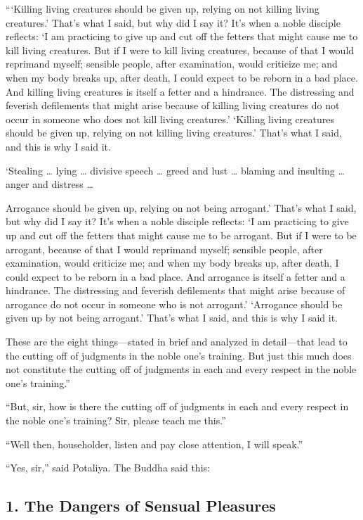 \documentclass[12pt,openany]{book}%
\begin{document}
“‘Killing living creatures should be given up, relying on not killing living creatures.’ That’s what I said, but why did I say it? It’s when a noble disciple reflects: ‘I am practicing to give up and cut off the fetters that might cause me to kill living creatures. But if I were to kill living creatures, because of that I would reprimand myself; sensible people, after examination, would criticize me; and when my body breaks up, after death, I could expect to be reborn in a bad place. And killing living creatures is itself a fetter and a hindrance. The distressing and feverish defilements that might arise because of killing living creatures do not occur in someone who does not kill living creatures.’ ‘Killing living creatures should be given up, relying on not killing living creatures.’ That’s what I said, and this is why I said it. 

‘Stealing … lying … divisive speech … greed and lust … blaming and insulting … anger and distress … 

Arrogance should be given up, relying on not being arrogant.’ That’s what I said, but why did I say it? It’s when a noble disciple reflects: ‘I am practicing to give up and cut off the fetters that might cause me to be arrogant. But if I were to be arrogant, because of that I would reprimand myself; sensible people, after examination, would criticize me; and when my body breaks up, after death, I could expect to be reborn in a bad place. And arrogance is itself a fetter and a hindrance. The distressing and feverish defilements that might arise because of arrogance do not occur in someone who is not arrogant.’ ‘Arrogance should be given up by not being arrogant.’ That’s what I said, and this is why I said it. 

These are the eight things—stated in brief and analyzed in detail—that lead to the cutting off of judgments in the noble one’s training. But just this much does not constitute the cutting off of judgments in each and every respect in the noble one’s training.” 

“But, sir, how is there the cutting off of judgments in each and every respect in the noble one’s training? Sir, please teach me this.” 

“Well then, householder, listen and pay close attention, I will speak.” 

“Yes, sir,” said Potaliya. The Buddha said this: 

\subsection*{1. The Dangers of Sensual Pleasures }
\end{document}
